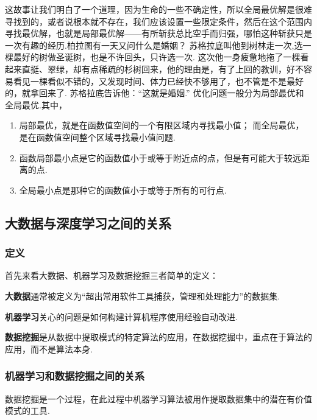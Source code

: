 这故事让我们明白了一个道理，因为生命的一些不确定性，所以全局最优解是很难寻找到的，或者说根本就不存在，我们应该设置一些限定条件，然后在这个范围内寻找最优解，也就是局部最优解------有所斩获总比空手而归强，哪怕这种斩获只是一次有趣的经历.
​
柏拉图有一天又问什么是婚姻？
苏格拉底叫他到树林走一次,选一棵最好的树做圣诞树，也是不许回头，只许选一次.
这次他一身疲惫地拖了一棵看起来直挺、翠绿，却有点稀疏的杉树回来，他的理由是，有了上回的教训，好不容易看见一棵看似不错的，又发现时间、体力已经快不够用了，也不管是不是最好的，就拿回来了.
苏格拉底告诉他：``这就是婚姻.''
​ 优化问题一般分为局部最优和全局最优.其中，
\begin{enumerate}
\item 局部最优，就是在函数值空间的一个有限区域内寻找最小值；
  而全局最优，是在函数值空间整个区域寻找最小值问题.
\item 函数局部最小点是它的函数值小于或等于附近点的点，但是有可能大于较远距离的点.
\item 全局最小点是那种它的函数值小于或等于所有的可行点.
\end{enumerate}

\subsection{大数据与深度学习之间的关系}
\label{ux5927ux6570ux636eux4e0eux6df1ux5ea6ux5b66ux4e60ux4e4bux95f4ux7684ux5173ux7cfb}
\subsubsection{定义}
首先来看大数据、机器学习及数据挖掘三者简单的定义：
\begin{defination}
\textbf{大数据}通常被定义为``超出常用软件工具捕获，管理和处理能力''的数据集.  
\end{defination}

\begin{defination}
\textbf{机器学习}关心的问题是如何构建计算机程序使用经验自动改进.  
\end{defination}
\begin{defination}
\textbf{数据挖掘}是从数据中提取模式的特定算法的应用，在数据挖掘中，重点在于算法的应用，而不是算法本身.  
\end{defination}

\subsubsection{\textbf{机器学习和数据挖掘}之间的关系}
数据挖掘是一个过程，在此过程中机器学习算法被用作提取数据集中的潜在有价值模式的工具.
